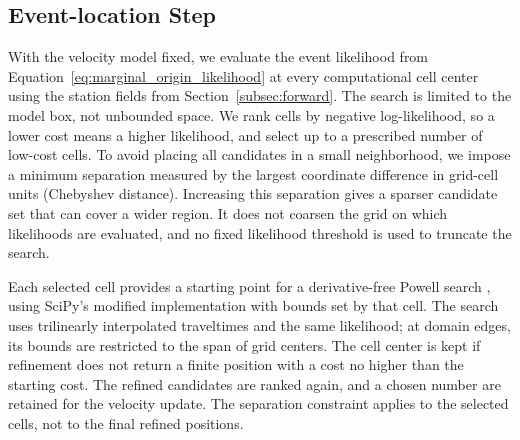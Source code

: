 \documentclass[12pt, a4paper]{article}
\begin{document}
\subsection{Event-location Step}
\label{subsec:estep}

With the velocity model fixed, we evaluate the event likelihood from Equation~\ref{eq:marginal_origin_likelihood} at every computational cell center using the station fields from Section~\ref{subsec:forward}. The search is limited to the model box, not unbounded space. We rank cells by negative log-likelihood, so a lower cost means a higher likelihood, and select up to a prescribed number of low-cost cells. To avoid placing all candidates in a small neighborhood, we impose a minimum separation measured by the largest coordinate difference in grid-cell units (Chebyshev distance). Increasing this separation gives a sparser candidate set that can cover a wider region. It does not coarsen the grid on which likelihoods are evaluated, and no fixed likelihood threshold is used to truncate the search.

Each selected cell provides a starting point for a derivative-free Powell search \parencite{powell1964}, using SciPy's modified implementation with bounds set by that cell. The search uses trilinearly interpolated traveltimes and the same likelihood; at domain edges, its bounds are restricted to the span of grid centers. The cell center is kept if refinement does not return a finite position with a cost no higher than the starting cost. The refined candidates are ranked again, and a chosen number are retained for the velocity update. The separation constraint applies to the selected cells, not to the final refined positions.
\end{document}
